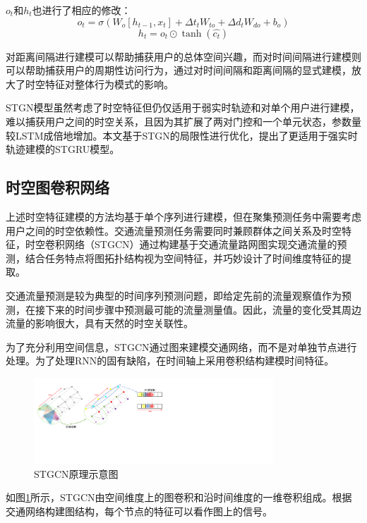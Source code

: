\documentclass[master]{thesis-uestc}
\begin{document}
$o_t$和$h_t$也进行了相应的修改：
\begin{equation}
   o_t=\sigma(W_o[h_{t-1},x_t]+\Delta t_tW_{to}+\Delta d_tW_{do}+b_o)
\end{equation}
\begin{equation}
   h_t=o_t \odot \tanh(\hat{c_t})
\end{equation}

对距离间隔进行建模可以帮助捕获用户的总体空间兴趣，而对时间间隔进行建模则可以帮助捕获用户的周期性访问行为，通过对时间间隔和距离间隔的显式建模，放大了时空特征对整体行为模式的影响。

STGN模型虽然考虑了时空特征但仍仅适用于弱实时轨迹和对单个用户进行建模，难以捕获用户之间的时空关系，且因为其扩展了两对门控和一个单元状态，参数量较LSTM成倍地增加。本文基于STGN的局限性进行优化，提出了更适用于强实时轨迹建模的STGRU模型。

\subsection{时空图卷积网络}
上述时空特征建模的方法均基于单个序列进行建模，但在聚集预测任务中需要考虑用户之间的时空依赖性。交通流量预测任务需要同时兼顾群体之间关系及时空特征，时空卷积网络（STGCN）通过构建基于交通流量路网图实现交通流量的预测，结合任务特点将图拓扑结构视为空间特征，并巧妙设计了时间维度特征的提取。

交通流量预测是较为典型的时间序列预测问题，即给定先前的流量观察值作为预测，在接下来的时间步骤中预测最可能的流量测量值。因此，流量的变化受其周边流量的影响很大，具有天然的时空关联性。

为了充分利用空间信息，STGCN通过图来建模交通网络，而不是对单独节点进行处理。为了处理RNN的固有缺陷，在时间轴上采用卷积结构建模时间特征。

\begin{figure}[!ht]
\centering 
\includegraphics[width=0.8\textwidth]{./pic/astgcn.pdf}
\caption{STGCN原理示意图}
\label{Figure.2.12}
\end{figure}
如图\ref{Figure.2.12}所示，STGCN由空间维度上的图卷积和沿时间维度的一维卷积组成。根据交通网络构建图结构，每个节点的特征可以看作图上的信号。
\end{document}

